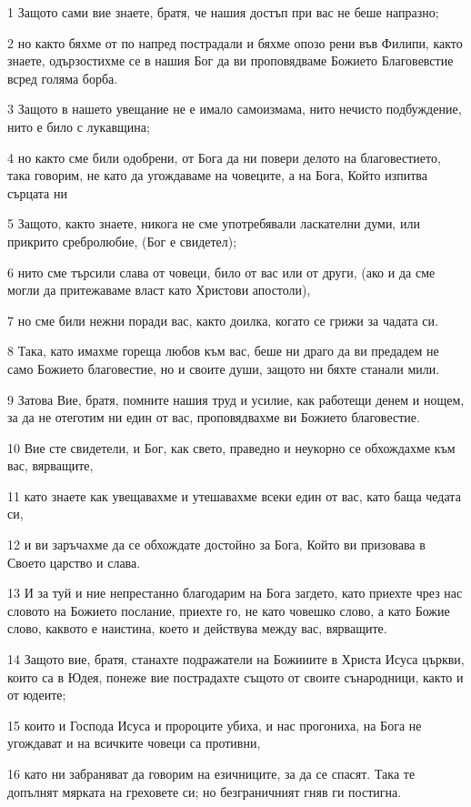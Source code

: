 \par 1 Защото сами вие знаете, братя, че нашия достъп при вас не беше напразно;
\par 2 но както бяхме от по напред пострадали и бяхме опозо рени във Филипи, както знаете, одързостихме се в нашия Бог да ви проповядваме Божието Благовевстие всред голяма борба.
\par 3 Защото в нашето увещание не е имало самоизмама, нито нечисто подбуждение, нито е било с лукавщина;
\par 4 но както сме били одобрени, от Бога да ни повери делото на благовестието, така говорим, не като да угождаваме на човеците, а на Бога, Който изпитва сърцата ни
\par 5 Защото, както знаете, никога не сме употребявали ласкателни думи, или прикрито сребролюбие, (Бог е свидетел);
\par 6 нито сме търсили слава от човеци, било от вас или от други, (ако и да сме могли да притежаваме власт като Христови апостоли),
\par 7 но сме били нежни поради вас, както доилка, когато се грижи за чадата си.
\par 8 Така, като имахме гореща любов към вас, беше ни драго да ви предадем не само Божието благовестие, но и своите души, защото ни бяхте станали мили.
\par 9 Затова Вие, братя, помните нашия труд и усилие, как работещи денем и нощем, за да не отеготим ни един от вас, проповядвахме ви Божието благовестие.
\par 10 Вие сте свидетели, и Бог, как свето, праведно и неукорно се обхождахме към вас, вярващите,
\par 11 като знаете как увещавахме и утешавахме всеки един от вас, като баща чедата си,
\par 12 и ви заръчахме да се обхождате достойно за Бога, Който ви призовава в Своето царство и слава.
\par 13 И за туй и ние непрестанно благодарим на Бога загдето, като приехте чрез нас словото на Божието послание, приехте го, не като човешко слово, а като Божие слово, каквото е наистина, което и действува между вас, вярващите.
\par 14 Защото вие, братя, станахте подражатели на Божииите в Христа Исуса църкви, които са в Юдея, понеже вие пострадахте същото от своите сънародници, както и от юдеите;
\par 15 които и Господа Исуса и пророците убиха, и нас прогониха, на Бога не угождават и на всичките човеци са противни,
\par 16 като ни забраняват да говорим на езичниците, за да се спасят. Така те допълнят мярката на греховете си; но безграничният гняв ги постигна.
